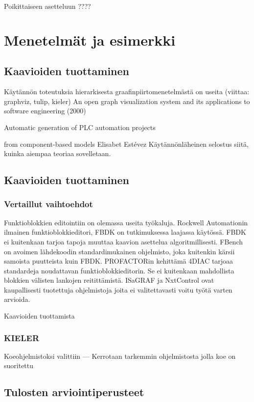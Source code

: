 \documentclass[finnish,12pt]{article}
\begin{document}
Poikittaiseen asetteluun ????

	\clearpage
	\section{Menetelmät ja esimerkki}

		\subsection{Kaavioiden tuottaminen}

Käytännön toteutuksia hierarkisesta graafinpiirtomenetelmästä on useita
(viittaa: graphviz, tulip, kieler)
An open graph visualization system and its applications to software engineering
(2000) 

Automatic generation of PLC automation projects

from component-based models
Elisabet Estévez
Käytännönläheinen selostus siitä, kuinka aiempaa teoriaa sovelletaan.

		\subsection{Kaavioiden tuottaminen}
			\subsubsection{Vertaillut vaihtoehdot}
	
Funktioblokkien editointiin on olemassa useita työkaluja.
Rockwell Automationin ilmainen funktioblokkieditori, FBDK on tutkimuksessa
laajassa käytössä.
FBDK ei kuitenkaan tarjoa tapoja muuttaa kaavion asettelua algoritmillisesti.
FBench on avoimen lähdekoodin standardimukainen ohjelmisto, joka kuitenkin
kärsii samoista puutteista kuin FBDK.
PROFACTORin kehittämä 4DIAC tarjoaa standardeja noudattavan funktioblokkieditorin.
Se ei kuitenkaan mahdollista blokkien välisten lankojen reitittämistä.
ISaGRAF ja NxtControl ovat kaupallisesti tuotettuja ohjelmistoja joita ei valitettavasti voitu työtä varten arvioida.

Kaavioiden tuottamista 

			\subsubsection{KIELER}

Koeohjelmistoksi valittiin --- 
Kerrotaan tarkemmin ohjelmistosta jolla koe on suoritettu

		\subsection{Tulosten arviointiperusteet}
\end{document}
